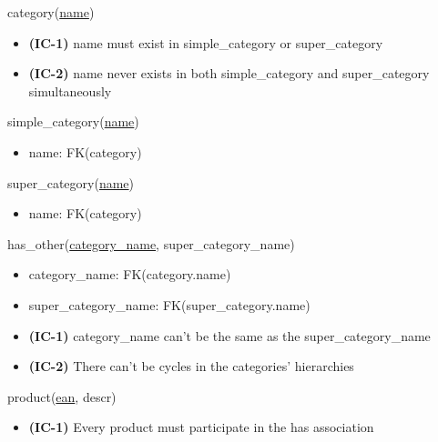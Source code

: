 \documentclass[12pt,a4paper]{article}
\begin{document}
  \vspace*{10pt}
  
  \noindent
  category(\underline{name})
  \begin{itemize}[nosep]
    \item \textsf{\textbf{(IC-1)}} name \textsf{must exist in} simple\_category \textsf{or} super\_category
    \item \textsf{\textbf{(IC-2)}} name \textsf{never exists in both} simple\_category \textsf{and} super\_category \textsf{simultaneously}
  \end{itemize}
  
  \vspace*{10pt}
  
  \noindent
  simple\_category(\underline{name})
  \begin{itemize}[nosep]
    \item name: FK(category)
  \end{itemize}
  
  \vspace*{10pt}
  
  \noindent
  super\_category(\underline{name})
  \begin{itemize}[nosep]
    \item name: FK(category)
  \end{itemize}
  
  \vspace*{10pt}
  
  \noindent
  has\_other(\underline{category\_name}, super\_category\_name)
  \begin{itemize}[nosep]
    \item category\_name: FK(category.name)
    \item super\_category\_name: FK(super\_category.name)
    \item \textsf{\textbf{(IC-1)}} category\_name \textsf{can't be the same as the} super\_category\_name
    \item \textsf{\textbf{(IC-2)} There can't be cycles in the categories' hierarchies}
  \end{itemize}
  
  \vspace*{10pt}
  
  \noindent
  product(\underline{ean}, descr)
  \begin{itemize}
    \item \textsf{\textbf{(IC-1)} Every} product \textsf{must participate in the} has \textsf{association}
  \end{itemize}
\end{document}
